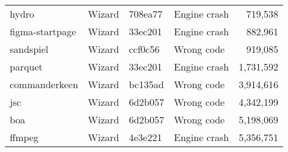 \begin{tabular}{llllr}
 hydro           & Wizard          & 708ea77    & Engine crash &     719,538 \\
 figma-startpage & Wizard          & 33ec201    & Engine crash &     882,961 \\
 sandspiel       & Wizard          & ccf0c56    & Wrong code   &     919,085 \\
 parquet         & Wizard          & 33ec201    & Engine crash &   1,731,592 \\
 commanderkeen   & Wizard          & bc135ad    & Wrong code   &   3,914,616 \\
 jsc             & Wizard          & 6d2b057    & Wrong code   &   4,342,199 \\
 boa             & Wizard          & 6d2b057    & Wrong code   &   5,198,069 \\
 ffmpeg          & Wizard          & 4e3e221    & Engine crash &   5,356,751 \\
\hline
\end{tabular}